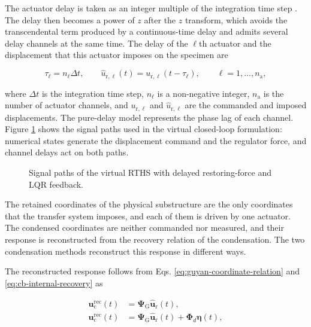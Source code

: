 \documentclass[a4paper,fleqn,review,12pt]{cas-sc}
\numberwithin{equation}{section}
\newcommand{\rev}[1]{{\color{red}#1}}
\begin{document}
The actuator delay is taken as an integer multiple of the integration time step \cite{Zhu2015}. The delay then becomes a power of \(z\) after the \(z\) transform, which avoids the transcendental term produced by a continuous-time delay and admits several delay channels at the same time. The delay of the \(\ell\)th actuator and the displacement that this actuator imposes on the specimen are

\begin{equation}
	\tau_{\ell}=n_{\ell}\Delta t,
	\qquad
	\hat{u}_{\mathrm{r},\ell}(t)=u_{\mathrm{r},\ell}(t-\tau_{\ell}),
	\qquad
	\ell=1,\dots,n_{\mathrm{a}},
	\label{eq:integer-delay}
\end{equation}

\rev{\noindent where \(\Delta t\) is the integration time step, \(n_\ell\) is a non-negative integer, \(n_{\mathrm a}\) is the number of actuator channels, and \(u_{\mathrm r,\ell}\) and \(\hat u_{\mathrm r,\ell}\) are the commanded and imposed displacements. The pure-delay model represents the phase lag of each channel. Figure \ref{fig:rths-loop} shows the signal paths used in the virtual closed-loop formulation: numerical states generate the displacement command and the regulator force, and channel delays act on both paths.}

\begin{figure}[htbp]
	\centering
	
	\caption{\rev{Signal paths of the virtual RTHS with delayed restoring-force and LQR feedback.}}
	\label{fig:rths-loop}
\end{figure}

The retained coordinates of the physical substructure are the only coordinates that the transfer system imposes, and each of them is driven by one actuator. The condensed coordinates are neither commanded nor measured, and their response is reconstructed from the recovery relation of the condensation. The two condensation methods reconstruct this response in different ways.

The reconstructed response follows from Eqs. \eqref{eq:guyan-coordinate-relation} and \eqref{eq:cb-internal-recovery} as

\begin{subequations}
	\label{eq:delay-recovery}
	\begin{align}
		\bm{u}_{\mathrm{c}}^{\mathrm{rec}}(t)&=\bm{\Psi}_{\mathrm{G}}\hat{\bm{u}}_{\mathrm{r}}(t),
		\label{eq:guyan-delay-recovery}\\
		\bm{u}_{\mathrm{c}}^{\mathrm{rec}}(t)&=\bm{\Psi}_{\mathrm{G}}\hat{\bm{u}}_{\mathrm{r}}(t)
		+\bm{\Phi}_{d}\bm{\eta}(t),
		\label{eq:cb-delay-recovery}
	\end{align}
\end{subequations}
\end{document}
